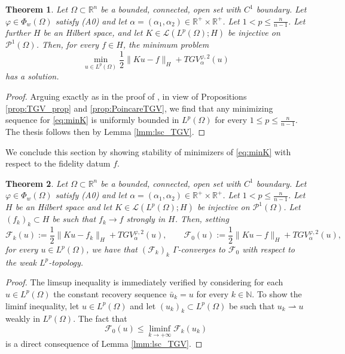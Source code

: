 \documentclass[a4paper,11pt,oneside,notitlepage]{article}
\newtheorem{theorem}{Theorem}[section]
\numberwithin{equation}{section}
\def\R{\mathbb{R}}
\def\N{\mathbb{N}}
\newcommand{\vphi}{\varphi}
\begin{document}
\begin{theorem}
    Let $\Omega \subset \R^n$ be a bounded, connected, open set with $C^1$ boundary. Let $\vphi \in \Phi_w(\Omega)$ satisfy (A0) and let $\alpha = (\alpha_1, \alpha_2) \in \R^+ \times \R^+$. Let $1 < p \le \tfrac{n}{n-1}$. Let further $H$ be an Hilbert space, and let $K \in \mathcal{L}(L^p(\Omega);H)$ be injective on $\mathcal{P}^1(\Omega)$. Then, for every $f \in H$, the minimum problem
    \begin{equation}
    \label{eq:minK}
        \min_{u \in L^p(\Omega)} \frac{1}{2} \|Ku-f\|_H + TGV^{\vphi,2}_\alpha(u)
    \end{equation}
    has a solution.
\end{theorem}
\begin{proof}
    Arguing exactly as in the proof of \cite[Theorem 4.2]{BV20}, in view of Propositions \ref{prop:TGV_prop} and \ref{prop:PoincareTGV}, we find that any minimizing sequence for \eqref{eq:minK} is uniformly bounded in $L^p(\Omega)$ for every $1\leq p \le \tfrac{n}{n-1}$. The thesis follows then by Lemma \ref{lmm:lsc_TGV}.
\end{proof}

We conclude this section by showing stability of minimizers of \eqref{eq:minK} with respect to the fidelity datum $f$.

\begin{theorem}
\label{thm:gamma-conv}
    Let $\Omega \subset \R^n$ be a bounded, connected, open set with $C^1$ boundary. Let $\vphi \in \Phi_w(\Omega)$ satisfy (A0) and let $\alpha = (\alpha_1, \alpha_2) \in \R^+ \times \R^+$. Let $1 < p \le \tfrac{n}{n-1}$. Let $H$ be an Hilbert space and let $K \in \mathcal{L}(L^p(\Omega);H)$ be injective on $\mathcal{P}^1(\Omega)$. Let $(f_k)_k \subset H$ be such that $f_k \to f$ strongly in $H$. Then, setting
    \begin{equation*}
        \mathcal{F}_k(u) := \frac{1}{2} \|Ku - f_k\|_H + TGV^{\vphi,2}_\alpha(u),
        \qquad
        \mathcal{F}_0(u) := \frac{1}{2} \|Ku - f\|_H + TGV^{\vphi,2}_\alpha(u),
    \end{equation*}
    for every $u\in L^p(\Omega)$, we have that $(\mathcal{F}_k)_k$ $\Gamma$-converges to $\mathcal{F}_0$ with respect to the weak $L^p$-topology.
\end{theorem}
\begin{proof}
    The limsup inequality is immediately verified by considering for each $u\in L^p(\Omega)$ the constant recovery sequence $\bar{u}_k = u$ for every $k \in \N$. To show the liminf inequality, let $u \in L^p(\Omega)$ and let $(u_k)_k \subset L^p(\Omega)$ be such that $u_k \rightharpoonup u$ weakly in $L^p(\Omega)$. The fact that
    \begin{equation*}
        \mathcal{F}_0(u) \le \liminf_{k \to +\infty} \mathcal{F}_k(u_k)
    \end{equation*}
    is a direct consequence of Lemma \ref{lmm:lsc_TGV}.
\end{proof}
\end{document}
